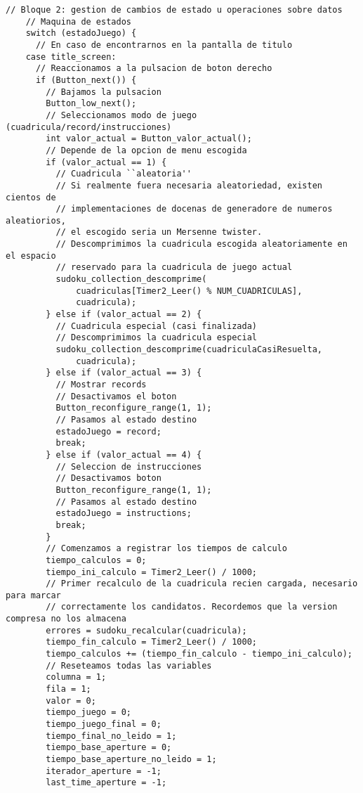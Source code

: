 \documentclass[12pt,letterpaper]{article}
\begin{document}
{\begin{lstlisting}[frame=single]
    // Bloque 2: gestion de cambios de estado u operaciones sobre datos
    // Maquina de estados
    switch (estadoJuego) {
      // En caso de encontrarnos en la pantalla de titulo
    case title_screen:
      // Reaccionamos a la pulsacion de boton derecho
      if (Button_next()) {
        // Bajamos la pulsacion
        Button_low_next();
        // Seleccionamos modo de juego (cuadricula/record/instrucciones)
        int valor_actual = Button_valor_actual();
        // Depende de la opcion de menu escogida
        if (valor_actual == 1) {
          // Cuadricula ``aleatoria''
          // Si realmente fuera necesaria aleatoriedad, existen cientos de 
          // implementaciones de docenas de generadore de numeros aleatiorios, 
          // el escogido seria un Mersenne twister.
          // Descomprimimos la cuadricula escogida aleatoriamente en el espacio
          // reservado para la cuadricula de juego actual
          sudoku_collection_descomprime(
              cuadriculas[Timer2_Leer() % NUM_CUADRICULAS],
              cuadricula);
        } else if (valor_actual == 2) {
          // Cuadricula especial (casi finalizada)
          // Descomprimimos la cuadricula especial
          sudoku_collection_descomprime(cuadriculaCasiResuelta,
              cuadricula);
        } else if (valor_actual == 3) {
          // Mostrar records
          // Desactivamos el boton
          Button_reconfigure_range(1, 1);
          // Pasamos al estado destino
          estadoJuego = record;
          break;
        } else if (valor_actual == 4) {
          // Seleccion de instrucciones
          // Desactivamos boton
          Button_reconfigure_range(1, 1);
          // Pasamos al estado destino
          estadoJuego = instructions;
          break;
        }
        // Comenzamos a registrar los tiempos de calculo
        tiempo_calculos = 0;
        tiempo_ini_calculo = Timer2_Leer() / 1000;
        // Primer recalculo de la cuadricula recien cargada, necesario para marcar
        // correctamente los candidatos. Recordemos que la version compresa no los almacena
        errores = sudoku_recalcular(cuadricula);
        tiempo_fin_calculo = Timer2_Leer() / 1000;
        tiempo_calculos += (tiempo_fin_calculo - tiempo_ini_calculo);
        // Reseteamos todas las variables  
        columna = 1;
        fila = 1;
        valor = 0;
        tiempo_juego = 0;
        tiempo_juego_final = 0;
        tiempo_final_no_leido = 1;
        tiempo_base_aperture = 0;
        tiempo_base_aperture_no_leido = 1;
        iterador_aperture = -1;
        last_time_aperture = -1;

\end{lstlisting}}
\end{document}
